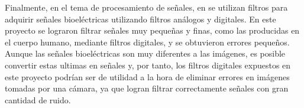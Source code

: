 \documentclass[a4paper, 11pt, oneside]{article}
\begin{document}
	Finalmente, en el tema de procesamiento de señales, en \cite{th5} se utilizan filtros para adquirir 
        señales bioeléctricas utilizando filtros análogos y digitales. En este proyecto se lograron filtrar 
        señales muy pequeñas y finas, como las producidas en el cuerpo humano, mediante filtros digitales, y se
	obtuvieron errores pequeños. Aunque las señales bioeléctricas son muy diferentes a las imágenes, es posible 
        convertir estas ultimas en señales y, por tanto, los filtros digitales expuestos en este proyecto podrían 
        ser de utilidad a la hora de eliminar errores en imágenes tomadas por una cámara, ya que logran filtrar
	correctamente señales con gran cantidad de ruido.\newline



\end{document}

